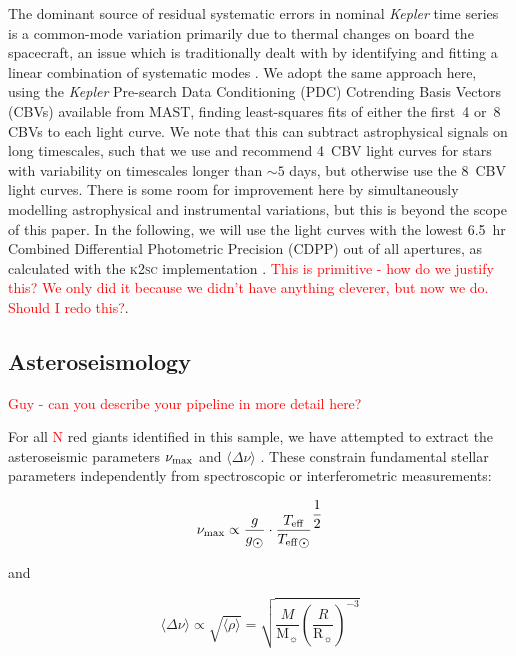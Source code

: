 \documentclass[a4paper,fleqn,usenatbib]{mnras}
\newcommand{\numax}{\mbox{$\nu_{\rm max}$}\xspace}
\newcommand{\Dnu}{\mbox{$\Delta \nu$}\xspace}
\newcommand{\teff}{\mbox{$T_{\rm eff}$}\xspace}
\newcommand{\msun}{\mbox{$\mathrm{M}_{\sun}$}\xspace}
\newcommand{\rsun}{\mbox{$\mathrm{R}_{\sun}$}\xspace}
\newcommand{\kepler}{\emph{Kepler}\xspace}
\begin{document}
The dominant source of residual systematic errors in nominal \kepler time series is a common-mode variation primarily due to thermal changes on board the spacecraft, an issue which is traditionally dealt with by identifying and fitting a linear combination of systematic modes \citep{pdc0,pdc1,pdc2,petigura}. We adopt the same approach here, using the \kepler Pre-search Data Conditioning (PDC) Cotrending Basis Vectors (CBVs) available from MAST, finding least-squares fits of  either the first~4 or~8 CBVs to each light curve. We note that this can subtract astrophysical signals on long timescales, such that we use and recommend 4~CBV light curves for stars with variability on timescales longer than $\sim 5$ days, but otherwise use the 8~CBV light curves. There is some room for improvement here by simultaneously modelling astrophysical and instrumental variations, but this is beyond the scope of this paper. In the following, we will use the light curves with the lowest 6.5~hr Combined Differential Photometric Precision (CDPP) \citep{cdpp} out of all apertures, as calculated with the \textsc{k2sc} implementation \citep{k2sc}. \textcolor{red}{This is primitive - how do we justify this? We only did it because we didn't have anything cleverer, but now we do. Should I redo this?}.

\subsection{Asteroseismology}
\label{asteroseismology}

\textcolor{red}{Guy - can you describe your pipeline in more detail here?}

For all \textcolor{red}{N} red giants identified in this sample, we have attempted to extract the asteroseismic parameters \numax and $\langle \Dnu \rangle$ \citep{KB95,2013ARA&A..51..353C}. These constrain fundamental stellar parameters independently from spectroscopic or interferometric measurements: 

\begin{equation}
\label{scaling}
\numax \propto \dfrac{g}{g_{\sun}} \cdot \dfrac{\teff}{\teff_{\sun}}^{\dfrac{1}{2}}
\end{equation}

and

\begin{equation}
\langle \Dnu \rangle \propto \sqrt{\langle \rho \rangle} = \sqrt{\dfrac{M}{\msun} (\dfrac{R}{\rsun})^{-3}}
\end{equation}
\end{document}
